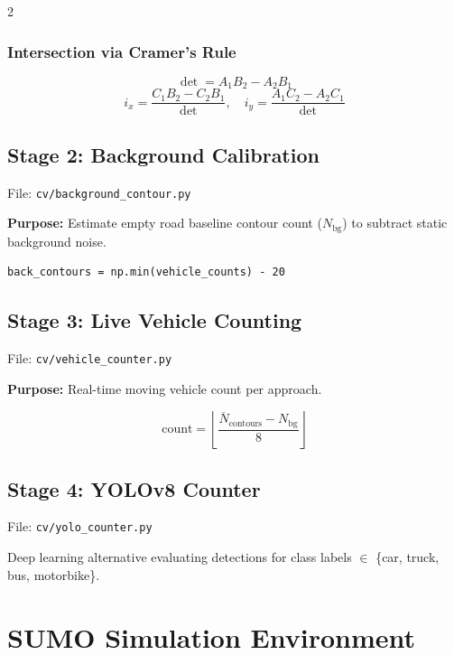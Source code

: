 \documentclass[10pt, a4paper]{article}
\begin{document}
\begin{multicols}{2}
\subsubsection{Intersection via Cramer's Rule}
\begin{equation}
\det = A_1 B_2 - A_2 B_1
\end{equation}
\begin{equation}
i_x = \frac{C_1 B_2 - C_2 B_1}{\det},\quad
i_y = \frac{A_1 C_2 - A_2 C_1}{\det}
\end{equation}

\subsection{Stage 2: Background Calibration}
File: \texttt{cv/background\_contour.py}

\textbf{Purpose:} Estimate empty road baseline contour count ($N_{\text{bg}}$)
to subtract static background noise.

\begin{codebox}
\footnotesize
\begin{verbatim}
back_contours = np.min(vehicle_counts) - 20
\end{verbatim}
\end{codebox}

\subsection{Stage 3: Live Vehicle Counting}
File: \texttt{cv/vehicle\_counter.py}

\textbf{Purpose:} Real-time moving vehicle count per approach.

\begin{equation}
\text{count} = \left\lfloor
  \frac{\overline{N}_{\text{contours}} - N_{\text{bg}}}{8}
\right\rfloor
\end{equation}

\subsection{Stage 4: YOLOv8 Counter}
File: \texttt{cv/yolo\_counter.py}

Deep learning alternative evaluating detections for class labels
$\in$ \{car, truck, bus, motorbike\}.
\columnbreak
\section{SUMO Simulation Environment}


\end{multicols}
\end{document}
